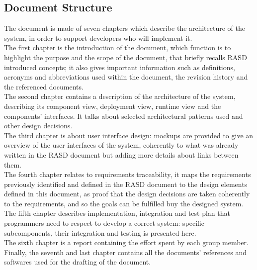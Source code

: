 \subsection{Document Structure}
The document is made of seven chapters which describe the architecture of the system, in order to support developers who will implement it. \\
The first chapter is the introduction of the document, which function is to highlight the purpose and the scope of the document, that briefly recalls RASD introduced concepts; it also gives important information such as definitions, acronyms and abbreviations used within the document, the revision history and the referenced documents.\\
The second chapter contains a description of the architecture of the system, describing its component view, deployment view, runtime view and the components’ interfaces. It talks about selected architectural patterns used and other design decisions.\\
The third chapter is about user interface design: mockups are provided to give an overview of the user interfaces of the system, coherently to what was already written in the RASD document but adding more details about links between them.\\
The fourth chapter relates to requirements traceability, it maps the requirements previously identified and defined in the RASD document to the design elements defined in this document, as proof that the design decisions are taken coherently to the requirements, and so the goals can be fulfilled buy the designed system.\\
The fifth chapter describes implementation, integration and test plan that programmers need to respect to develop a correct system: specific subcomponents, their integration and testing is presented here.\\
The sixth chapter is a report containing the effort spent by each group member.\\
Finally, the seventh and last chapter contains all the documents’ references and softwares used for the drafting of the document.
